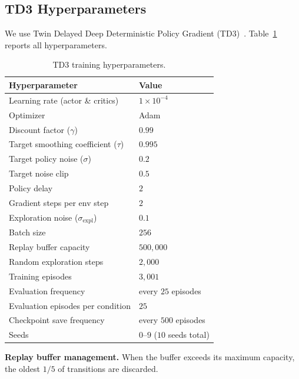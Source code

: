 \subsection{TD3 Hyperparameters}
\label{app:td3}

We use Twin Delayed Deep Deterministic Policy Gradient (TD3)~\cite{fujimoto2018td3}.
Table~\ref{tab:td3_hyper} reports all hyperparameters.

\begin{table}[h]
\centering
\caption{TD3 training hyperparameters.}
\label{tab:td3_hyper}
\begin{tabular}{ll}
\toprule
\textbf{Hyperparameter}            & \textbf{Value}     \\
\midrule
Learning rate (actor \& critics)   & $1 \times 10^{-4}$ \\
Optimizer                          & Adam               \\
Discount factor ($\gamma$)         & $0.99$             \\
Target smoothing coefficient ($\tau$) & $0.995$         \\
Target policy noise ($\sigma$)     & $0.2$              \\
Target noise clip                  & $0.5$              \\
Policy delay                       & $2$                \\
Gradient steps per env step        & $2$                \\
Exploration noise ($\sigma_{\mathrm{expl}}$) & $0.1$    \\
Batch size                         & $256$              \\
Replay buffer capacity             & $500{,}000$        \\
Random exploration steps           & $2{,}000$          \\
Training episodes                  & $3{,}001$          \\
Evaluation frequency               & every $25$ episodes \\
Evaluation episodes per condition  & $25$               \\
Checkpoint save frequency          & every $500$ episodes \\
Seeds                              & $0$--$9$ ($10$ seeds total) \\
\bottomrule
\end{tabular}
\end{table}

\noindent\textbf{Replay buffer management.}
When the buffer exceeds its maximum capacity, the oldest $1/5$ of transitions are discarded.

